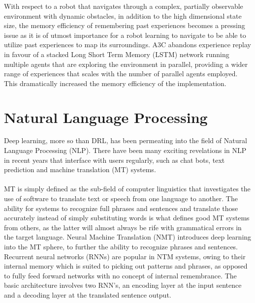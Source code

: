With respect to a robot that navigates through a complex, partially observable environment with dynamic obstacles, in addition to the high dimensional state size, the memory efficiency of remembering past experiences becomes a pressing issue as it is of utmost importance for a robot learning to navigate to be able to utilize past experiences to map its surroundings. A3C abandons experience replay in favour of a stacked Long Short Term Memory (LSTM) network running multiple agents that are exploring the environment in parallel, providing a wider range of experiences that scales with the number of parallel agents employed. This dramatically increased the memory efficiency of the implementation.

\section{Natural Language Processing}
Deep learning, more so than DRL, has been permeating into the field of Natural Language Processing (NLP). There have been many exciting revelations in NLP in recent years that interface with users regularly, such as chat bots, text prediction and machine translation (MT) systems. \paragraph{}

MT is simply defined as the sub-field of computer linguistics that investigates the use of software to translate text or speech from one language to another. The ability for systems to recognize full phrases and sentences and translate those accurately instead of simply substituting words is what defines good MT systems from others, as the latter will almost always be rife with grammatical errors in the target language. Neural Machine Translation (NMT) introduces deep learning into the MT sphere, to further the ability to recognize phrases and sentences. Recurrent neural networks (RNNs) are popular in NTM systems, owing to their internal memory which is suited to picking out patterns and phrases, as opposed to fully feed forward networks with no concept of internal remembrance. The basic architecture involves two RNN's, an encoding layer at the input sentence and a decoding layer at the translated sentence output. \paragraph{}

